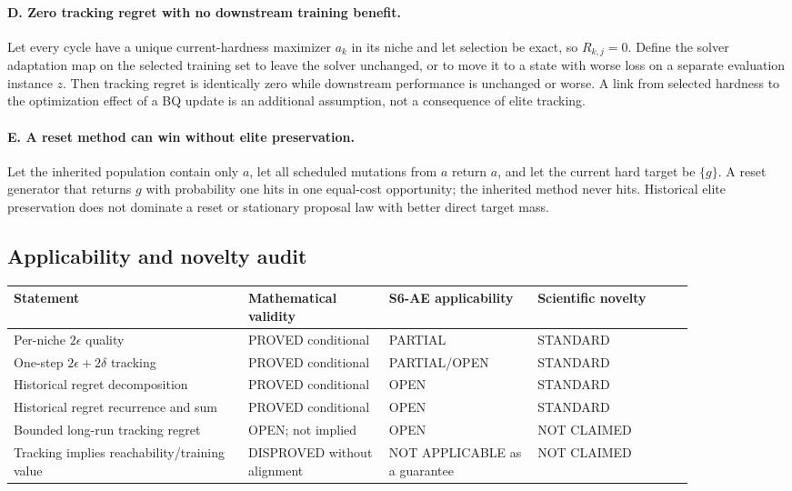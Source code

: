 \paragraph{D. Zero tracking regret with no downstream training benefit.}
Let every cycle have a unique current-hardness maximizer $a_k$ in its niche
and let selection be exact, so $R_{k,j}=0$.  Define the solver adaptation map
on the selected training set to leave the solver unchanged, or to move it to
a state with worse loss on a separate evaluation instance $z$.  Then tracking
regret is identically zero while downstream performance is unchanged or
worse.  A link from selected hardness to the optimization effect of a BQ
update is an additional assumption, not a consequence of elite tracking.

\paragraph{E. A reset method can win without elite preservation.}
Let the inherited population contain only $a$, let all scheduled mutations
from $a$ return $a$, and let the current hard target be $\{g\}$.  A reset
generator that returns $g$ with probability one hits in one equal-cost
opportunity; the inherited method never hits.  Historical elite preservation
does not dominate a reset or stationary proposal law with better direct
target mass.

\subsection{Applicability and novelty audit}
\begin{center}
\begin{tabular}{>{\raggedright\arraybackslash}p{0.30\linewidth}>{\raggedright\arraybackslash}p{0.18\linewidth}>{\raggedright\arraybackslash}p{0.19\linewidth}>{\raggedright\arraybackslash}p{0.20\linewidth}}
\toprule
Statement & Mathematical validity & S6-AE applicability & Scientific novelty \\
\midrule
Per-niche $2\epsilon$ quality & PROVED conditional & PARTIAL & STANDARD \\
One-step $2\epsilon+2\delta$ tracking & PROVED conditional & PARTIAL/OPEN & STANDARD \\
Historical regret decomposition & PROVED conditional & OPEN & STANDARD \\
Historical regret recurrence and sum & PROVED conditional & OPEN & STANDARD \\
Bounded long-run tracking regret & OPEN; not implied & OPEN & NOT CLAIMED \\
Tracking implies reachability/training value & DISPROVED without alignment & NOT APPLICABLE as a guarantee & NOT CLAIMED \\
\bottomrule
\end{tabular}
\end{center}

